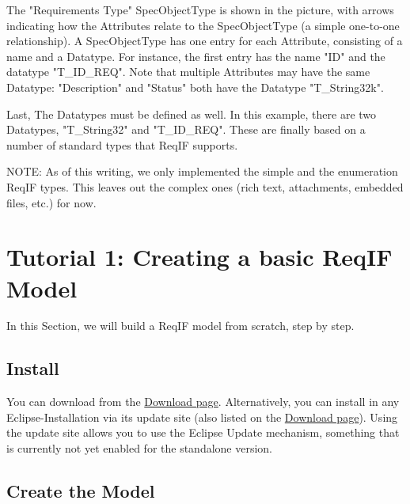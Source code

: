 The "Requirements Type" SpecObjectType is shown in the picture, with arrows indicating how the Attributes relate to the SpecObjectType (a simple one-to-one relationship).  A SpecObjectType has one entry for each Attribute, consisting of a name and a Datatype.  For instance, the first entry has the name "ID" and the datatype "T\_ID\_REQ".  Note that multiple Attributes may have the same Datatype: "Description" and "Status" both have the Datatype "T\_String32k".

Last, The Datatypes must be defined as well.  In this example, there are two Datatypes, "T\_String32" and "T\_ID\_REQ".  These are finally based on a number of standard types that ReqIF supports.

NOTE: As of this writing, we only implemented the simple and the enumeration ReqIF types.  This leaves out the complex ones (rich text, attachments, embedded files, etc.) for now.

\section{Tutorial 1: Creating a basic ReqIF Model}

In this Section, we will build a ReqIF model from scratch, step by step.

\subsection{Install \pror{}}

You can download \pror{} from the \href{https://www.eclipse.org/rmf/download.php}{Download page}.  Alternatively, you can install \pror{} in any Eclipse-Installation via its update site (also listed on the \href{https://www.eclipse.org/rmf/download.php}{Download page}).  Using the update site allows you to use the Eclipse Update mechanism, something that is currently not yet enabled for the standalone version.

\subsection{Create the Model}

